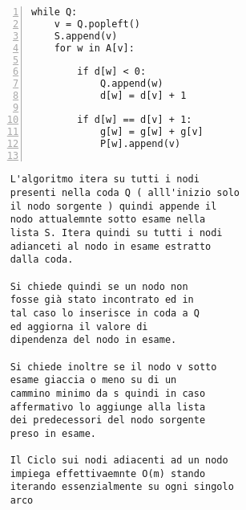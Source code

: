 \begin{minipage}{0.49\linewidth}
	\begin{Verbatim}[frame=topline,numbers=left,label=Codice,framesep=3mm]
 while Q:
	v = Q.popleft()
	S.append(v)
	for w in A[v]:
	
		if d[w] < 0:
			Q.append(w)
			d[w] = d[v] + 1
		
		if d[w] == d[v] + 1:
			g[w] = g[w] + g[v]
			P[w].append(v)
	
	\end{Verbatim}
\end{minipage}\hfill
\begin{minipage}{0.8\linewidth}
	\begin{Verbatim}
	L'algoritmo itera su tutti i nodi 
	presenti nella coda Q ( alll'inizio solo 
	il nodo sorgente ) quindi appende il
	nodo attualemnte sotto esame nella
	lista S. Itera quindi su tutti i nodi
	adianceti al nodo in esame estratto
	dalla coda.
	
	Si chiede quindi se un nodo non 
	fosse già stato incontrato ed in 
	tal caso lo inserisce in coda a Q
	ed aggiorna il valore di 
	dipendenza del nodo in esame.
	
	Si chiede inoltre se il nodo v sotto
	esame giaccia o meno su di un 
	cammino minimo da s quindi in caso
	affermativo lo aggiunge alla lista
	dei predecessori del nodo sorgente
	preso in esame.
	
	Il Ciclo sui nodi adiacenti ad un nodo
	impiega effettivaemnte O(m) stando
	iterando essenzialmente su ogni singolo 
	arco
	\end{Verbatim}
\end{minipage}